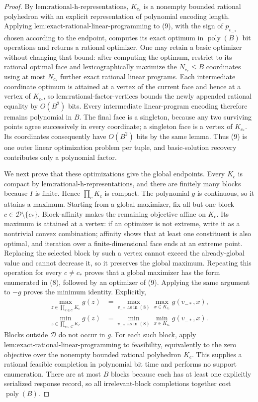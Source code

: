 \documentclass{article}
\begin{document}
\begin{proof}
By \(\text{lem:rational-h-representations}\), \(K_{c_*}\) is a nonempty bounded rational polyhedron with an explicit representation of polynomial encoding length.  Applying \(\text{lem:exact-rational-linear-programming}\) to (9), with the sign of \(p_{v_{-*}}\) chosen according to the endpoint, computes its exact optimum in \(\operatorname{poly}(B)\) bit operations and returns a rational optimizer.  One may retain a basic optimizer without changing that bound: after computing the optimum, restrict to its rational optimal face and lexicographically maximize the \(N_{c_*}\le B\) coordinates using at most \(N_{c_*}\) further exact rational linear programs.  Each intermediate coordinate optimum is attained at a vertex of the current face and hence at a vertex of \(K_{c_*}\), so \(\text{lem:rational-factor-vertices}\) bounds the newly appended rational equality by \(O(B^2)\) bits.  Every intermediate linear-program encoding therefore remains polynomial in \(B\).  The final face is a singleton, because any two surviving points agree successively in every coordinate; a singleton face is a vertex of \(K_{c_*}\).  Its coordinates consequently have \(O(B^2)\) bits by the same lemma.  Thus (9) is one outer linear optimization problem per tuple, and basic-solution recovery contributes only a polynomial factor.

We next prove that these optimizations give the global endpoints.  Every \(K_c\) is compact by \(\text{lem:rational-h-representations}\), and there are finitely many blocks because \(I\) is finite.  Hence \(\prod_cK_c\) is compact.  The polynomial \(g\) is continuous, so it attains a maximum.  Starting from a global maximizer, fix all but one block \(c\in\mathcal D\setminus\{c_*\}\).  Block-affinity makes the remaining objective affine on \(K_c\).  Its maximum is attained at a vertex: if an optimizer is not extreme, write it as a nontrivial convex combination; affinity shows that at least one constituent is also optimal, and iteration over a finite-dimensional face ends at an extreme point.  Replacing the selected block by such a vertex cannot exceed the already-global value and cannot decrease it, so it preserves the global maximum.  Repeating this operation for every \(c\ne c_*\) proves that a global maximizer has the form enumerated in (8), followed by an optimizer of (9).  Applying the same argument to \(-g\) proves the minimum identity.  Explicitly,
\[
 \begin{aligned}
 \max_{z\in\prod_{c\in C}K_c}g(z)
 &=\max_{v_{-*}\text{ as in }(8)}
   \max_{x\in K_{c_*}}g(v_{-*},x),\\
 \min_{z\in\prod_{c\in C}K_c}g(z)
 &=\min_{v_{-*}\text{ as in }(8)}
   \min_{x\in K_{c_*}}g(v_{-*},x).
 \end{aligned}
 \tag{10}
\]
Blocks outside \(\mathcal D\) do not occur in \(g\).  For each such block, apply \(\text{lem:exact-rational-linear-programming}\) to feasibility, equivalently to the zero objective over the nonempty bounded rational polyhedron \(K_c\).  This supplies a rational feasible completion in polynomial bit time and performs no support enumeration.  There are at most \(B\) blocks because each has at least one explicitly serialized response record, so all irrelevant-block completions together cost \(\operatorname{poly}(B)\).


\end{proof}
\end{document}
